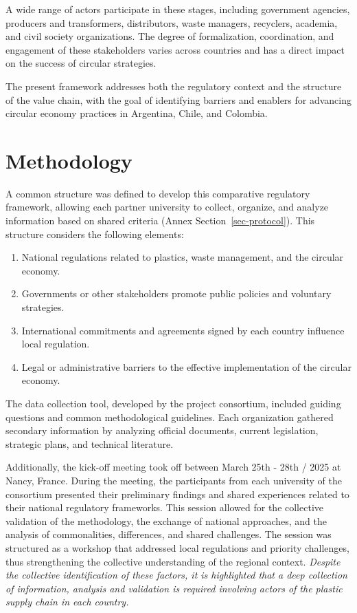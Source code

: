\documentclass[
  12pt,
  oneside]{book}
\providecommand{\tightlist}{%
  \setlength{\itemsep}{0pt}\setlength{\parskip}{0pt}}
\begin{document}
A wide range of actors participate in these stages, including government
agencies, producers and transformers, distributors, waste managers,
recyclers, academia, and civil society organizations. The degree of
formalization, coordination, and engagement of these stakeholders varies
across countries and has a direct impact on the success of circular
strategies.

The present framework addresses both the regulatory context and the
structure of the value chain, with the goal of identifying barriers and
enablers for advancing circular economy practices in Argentina, Chile,
and Colombia.

\chapter{Methodology}\label{methodology}

A common structure was defined to develop this comparative regulatory
framework, allowing each partner university to collect, organize, and
analyze information based on shared criteria (Annex
Section~\ref{sec-protocol}). This structure considers the following
elements:

\begin{enumerate}
\def\labelenumi{\arabic{enumi}.}
\tightlist
\item
  National regulations related to plastics, waste management, and the
  circular economy.
\item
  Governments or other stakeholders promote public policies and
  voluntary strategies.
\item
  International commitments and agreements signed by each country
  influence local regulation.
\item
  Legal or administrative barriers to the effective implementation of
  the circular economy.
\end{enumerate}

The data collection tool, developed by the project consortium, included
guiding questions and common methodological guidelines. Each
organization gathered secondary information by analyzing official
documents, current legislation, strategic plans, and technical
literature.

Additionally, the kick-off meeting took off between March 25th - 28th /
2025 at Nancy, France. During the meeting, the participants from each
university of the consortium presented their preliminary findings and
shared experiences related to their national regulatory frameworks. This
session allowed for the collective validation of the methodology, the
exchange of national approaches, and the analysis of commonalities,
differences, and shared challenges. The session was structured as a
workshop that addressed local regulations and priority challenges, thus
strengthening the collective understanding of the regional context.
\emph{Despite the collective identification of these factors, it is
highlighted that a deep collection of information, analysis and
validation is required involving actors of the plastic supply chain in
each country.}
\end{document}

